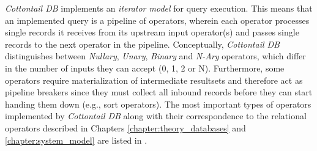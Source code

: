 \emph{Cottontail DB} implements an \emph{iterator model} for query execution. This means that an implemented query is a pipeline of operators, wherein each operator processes single records it receives from its upstream input operator(s) and passes single records to the next operator in the pipeline. Conceptually, \emph{Cottontail DB} distinguishes between \emph{Nullary}, \emph{Unary}, \emph{Binary} and \emph{N-Ary} operators, which differ in the number of inputs they can accept (0, 1, 2 or N). Furthermore, some operators require materialization of intermediate resultsets and therefore act as pipeline breakers since they must collect all inbound records before they can start handing them down (e.g., sort operators). The most important types of operators implemented by \emph{Cottontail DB} along with their correspondence to the relational operators described in Chapters \ref{chapter:theory_databases} and \ref{chapter:system_model} are listed in .

